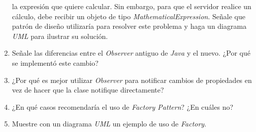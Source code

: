 \begin{enumerate}
    la expresión que quiere calcular.
    Sin embargo, para que el servidor realice un cálculo, debe recibir un objeto de tipo 
    \textit{MathematicalExpression}.
    Señale que patrón de diseño utilizaría para resolver este problema y haga un diagrama
    \textit{UML} para ilustrar su solución.
  \item Señale las diferencias entre el \textit{Observer} antiguo de \textit{Java} y el 
    nuevo. ¿Por qué se implementó este cambio?
  \item ¿Por qué es mejor utilizar \textit{Observer} para notificar cambios de propiedades
    en vez de hacer que la clase notifique directamente?
  \item ¿En qué casos recomendaría el uso de \textit{Factory Pattern}? ¿En cuáles no?
  \item Muestre con un diagrama \textit{UML} un ejemplo de uso de \textit{Factory}.
\end{enumerate}